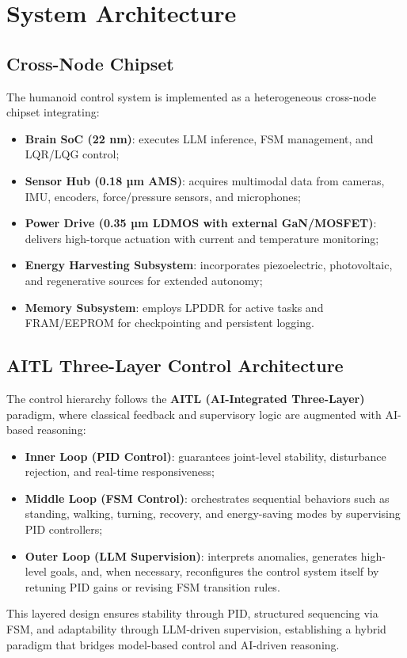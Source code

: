 \section{System Architecture}

\subsection{Cross-Node Chipset}
The humanoid control system is implemented as a heterogeneous cross-node chipset integrating:
\begin{itemize}
  \item \textbf{Brain SoC (22 nm)}: executes LLM inference, FSM management, and LQR/LQG control;
  \item \textbf{Sensor Hub (0.18 µm AMS)}: acquires multimodal data from cameras, IMU, encoders, force/pressure sensors, and microphones;
  \item \textbf{Power Drive (0.35 µm LDMOS with external GaN/MOSFET)}: delivers high-torque actuation with current and temperature monitoring;
  \item \textbf{Energy Harvesting Subsystem}: incorporates piezoelectric, photovoltaic, and regenerative sources for extended autonomy;
  \item \textbf{Memory Subsystem}: employs LPDDR for active tasks and FRAM/EEPROM for checkpointing and persistent logging.
\end{itemize}

\subsection{AITL Three-Layer Control Architecture}
The control hierarchy follows the \textbf{AITL (AI-Integrated Three-Layer)} paradigm, 
where classical feedback and supervisory logic are augmented with AI-based reasoning:
\begin{itemize}
  \item \textbf{Inner Loop (PID Control)}: guarantees joint-level stability, disturbance rejection, and real-time responsiveness;
  \item \textbf{Middle Loop (FSM Control)}: orchestrates sequential behaviors such as standing, walking, turning, recovery, and energy-saving modes by supervising PID controllers;
  \item \textbf{Outer Loop (LLM Supervision)}: interprets anomalies, generates high-level goals, and, when necessary, reconfigures the control system itself by retuning PID gains or revising FSM transition rules.
\end{itemize}
This layered design ensures stability through PID, structured sequencing via FSM, 
and adaptability through LLM-driven supervision, establishing a hybrid paradigm that 
bridges model-based control and AI-driven reasoning.

